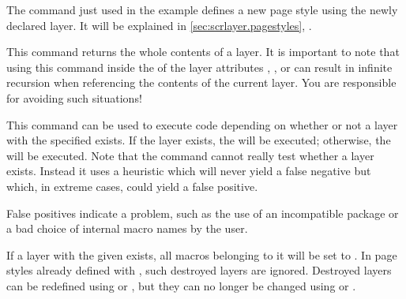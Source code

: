 The 
command just used in the example defines a new page style using the newly
declared layer. It will be explained in \autoref{sec:scrlayer.pagestyles},
.%
\EndIndexGroup


\begin{Declaration}
\end{Declaration}
This command returns the whole contents
of a layer. It is important to note that using this
command inside the  of the layer attributes ,
, or  can result in
infinite recursion when referencing the contents of the current layer. You
are responsible for avoiding such situations!%
\EndIndexGroup


\begin{Declaration}
\end{Declaration}
This command can be used to execute code depending on whether or not a layer
with the specified  exists. If the layer exists, the
 will be executed; otherwise, the  will be
executed. Note that the command cannot really test whether a layer exists.
Instead it uses a heuristic which will never yield a false negative but which,
in extreme cases, could yield a false positive.
\iffalse%
Nevertheless, if the test yields a false positive, something has gone wrong.
For example, this could indicate an incompatible package or that the user is
doing something he or she should not.%
\else
False positives indicate a problem, such as the use of an incompatible package
or a bad choice of internal macro names by the user.
\fi
\EndIndexGroup


\begin{Declaration}
\end{Declaration}
If a layer with the given  exists, all macros belonging to
it will be set to . In page styles already defined with
, such destroyed layers are ignored. Destroyed layers can be
redefined using  or
, but they can no longer be changed using
 or
.%
\iffalse %
\par
The command is intended to be used inside
\DescRef{\LabelBase.cmd.scrlayerOnAutoRemoveInterface} (see
\autoref{sec:scrlayer.enduserinterfaces},
\DescPageRef{scrlayer.cmd.scrlayerOnAutoRemoveInterface})
to remove layers defined using removable macros of an interface along with
that interface.%
\fi
\EndIndexGroup


